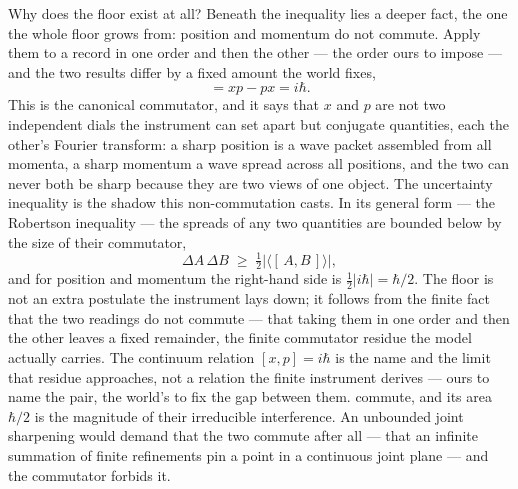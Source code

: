 Why does the floor exist at all? Beneath the inequality lies a deeper fact, the one the whole floor grows
from: position and momentum do not commute. Apply them to a record in one order and then the other --- the
order ours to impose --- and the two results differ by a fixed amount the world fixes,
\begin{equation}
  [\,x, p\,] = x p - p x = i\hbar .
\end{equation}
This is the canonical commutator, and it says that $x$ and $p$ are not two independent dials the instrument
can set apart but conjugate quantities, each the other's Fourier transform: a sharp position is a wave packet
assembled from all momenta, a sharp momentum a wave spread across all positions, and the two can never both be
sharp because they are two views of one object. The uncertainty inequality is the shadow this non-commutation
casts. In its general form --- the Robertson inequality --- the spreads of any two quantities are bounded
below by the size of their commutator,
\begin{equation}
  \Delta A\,\Delta B \;\ge\; \tfrac12\bigl|\langle [\,A, B\,]\rangle\bigr|,
\end{equation}
and for position and momentum the right-hand side is $\tfrac12|i\hbar| = \hbar/2$. The floor is not an extra
postulate the instrument lays down; it follows from the finite fact that the two readings do not commute ---
that taking them in one order and then the other leaves a fixed remainder, the finite commutator residue the
model actually carries. The continuum relation $[x,p] = i\hbar$ is the name and the limit that residue
approaches, not a relation the finite instrument derives --- ours to name the pair, the world's to fix the gap
between them.
commute, and its area $\hbar/2$ is the magnitude of their irreducible interference. An unbounded joint
sharpening would demand that the two commute after all --- that an infinite summation of finite refinements
pin a point in a continuous joint plane --- and the commutator forbids it.

